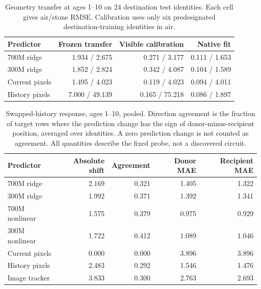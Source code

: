 \begin{table}[!htbp]\centering\small
\caption{Geometry transfer at ages 1--10 on 24 destination test identities. Each cell gives air/stone RMSE. Calibration uses only six predesignated destination-training identities in air.}
\begin{tabular}{@{}lrrr@{}}\toprule Predictor & Frozen transfer & Visible calibration & Native fit\\\midrule
700M ridge & 1.934 / 2.675 & 0.271 / 3.177 & 0.111 / 1.653\\
300M ridge & 1.852 / 2.824 & 0.342 / 4.087 & 0.104 / 1.589\\
Current pixels & 1.495 / 4.023 & 0.119 / 4.023 & 0.094 / 4.011\\
History pixels & 7.000 / 49.139 & 0.165 / 75.218 & 0.086 / 1.897\\
\bottomrule\end{tabular}\end{table}
\begin{table}[!htbp]\centering\small
\caption{Swapped-history response, ages 1--10, pooled. Direction agreement is the fraction of target rows where the prediction change has the sign of donor-minus-recipient position, averaged over identities. A zero prediction change is not counted as agreement. All quantities describe the fixed probe, not a discovered circuit.}
\begin{tabular}{@{}lrrrr@{}}\toprule Predictor & Absolute shift & Agreement & Donor MAE & Recipient MAE\\\midrule
700M ridge & 2.169 & 0.321 & 1.405 & 1.322\\
300M ridge & 1.992 & 0.371 & 1.392 & 1.341\\
700M nonlinear & 1.575 & 0.379 & 0.975 & 0.929\\
300M nonlinear & 1.722 & 0.412 & 1.089 & 1.046\\
Current pixels & 0.000 & 0.000 & 3.896 & 3.896\\
History pixels & 2.483 & 0.292 & 1.546 & 1.476\\
Image tracker & 3.833 & 0.300 & 2.763 & 2.693\\
\bottomrule\end{tabular}\end{table}
